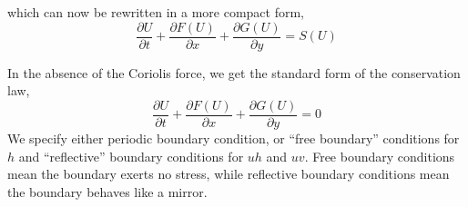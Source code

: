 which can now be rewritten in a more compact form,
\begin{equation}
 {\frac{\partial U}{\partial t} + \frac{\partial F(U)}{\partial x} + \frac{\partial G(U)}{\partial y} = S(U) } \label{eqn:2}
 \end{equation}

 
In the absence of the Coriolis force, we get the standard form of the conservation law,
\begin{equation}
{\frac{\partial U}{\partial t} + \frac{\partial F(U)}{\partial x} + \frac{\partial G(U)}{\partial y} = 0 } \label{eqn:3}
\end{equation}
We specify either periodic boundary condition, or ``free boundary'' conditions for $h$ and ``reflective'' boundary conditions for $uh$ and $uv$.
Free boundary conditions mean the boundary exerts no stress, while reflective boundary conditions mean the boundary behaves like a mirror.




